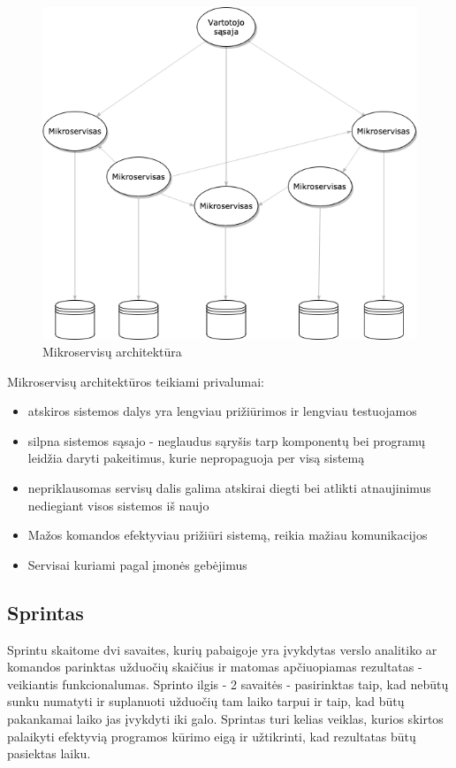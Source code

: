 \documentclass{VUMIFPSkursinis}
\begin{document}
		\begin{figure}[H]
		\centering
		\includegraphics[scale=0.6]{img/micro.png}
		\caption{Mikroservisų architektūra}
		\label{img:mikroservizai}
		\end{figure}
		Mikroservisų architektūros teikiami privalumai:
		\begin{itemize}
			\item{atskiros sistemos dalys yra lengviau prižiūrimos ir lengviau testuojamos}
			\item{silpna sistemos sąsajo - neglaudus sąryšis tarp komponentų bei programų leidžia daryti pakeitimus, kurie nepropaguoja per visą sistemą}
			\item{nepriklausomas servisų dalis galima atskirai diegti bei atlikti atnaujinimus nediegiant visos sistemos iš naujo}
			\item{Mažos komandos efektyviau prižiūri sistemą, reikia mažiau komunikacijos}
			\item{Servisai kuriami pagal įmonės gebėjimus}
		\end{itemize}
		
	\subsection{Sprintas}
	Sprintu skaitome dvi savaites, kurių pabaigoje yra įvykdytas verslo analitiko ar komandos parinktas užduočių skaičius ir matomas apčiuopiamas rezultatas - veikiantis funkcionalumas. Sprinto ilgis - 2 savaitės - pasirinktas taip, kad nebūtų sunku numatyti ir suplanuoti užduočių tam laiko tarpui ir taip, kad būtų pakankamai laiko jas įvykdyti iki galo. Sprintas turi kelias veiklas, kurios skirtos palaikyti efektyvią programos kūrimo eigą ir užtikrinti, kad rezultatas būtų pasiektas laiku.
\end{document}
